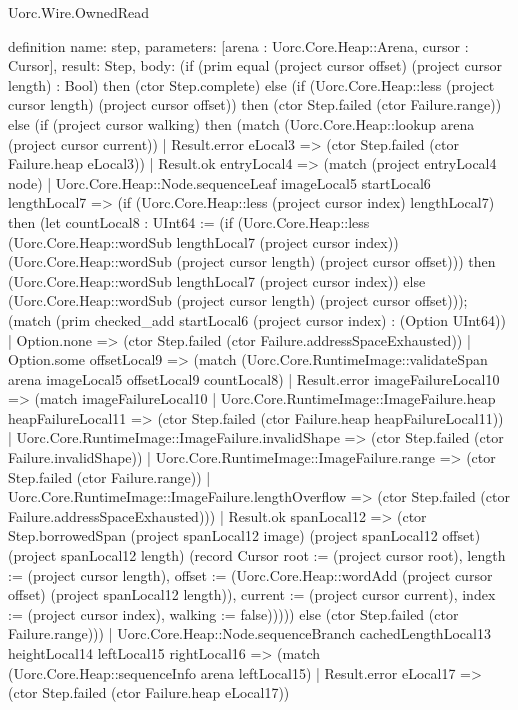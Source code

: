 \begin{lexlean}{Uorc.Wire.OwnedRead}
\begin{semanticmodule}
definition{
  name: step,
  parameters: [arena : Uorc.Core.Heap::Arena, cursor : Cursor],
  result: Step,
  body: (if (prim equal (project cursor offset) (project cursor length) : Bool) then (ctor Step.complete) else (if (Uorc.Core.Heap::less (project cursor length) (project cursor offset)) then (ctor Step.failed (ctor Failure.range)) else (if (project cursor walking) then (match (Uorc.Core.Heap::lookup arena (project cursor current))
    | Result.error eLocal3 => (ctor Step.failed (ctor Failure.heap eLocal3))
    | Result.ok entryLocal4 => (match (project entryLocal4 node)
      | Uorc.Core.Heap::Node.sequenceLeaf imageLocal5 startLocal6 lengthLocal7 => (if (Uorc.Core.Heap::less (project cursor index) lengthLocal7) then (let countLocal8 : UInt64 := (if (Uorc.Core.Heap::less (Uorc.Core.Heap::wordSub lengthLocal7 (project cursor index)) (Uorc.Core.Heap::wordSub (project cursor length) (project cursor offset))) then (Uorc.Core.Heap::wordSub lengthLocal7 (project cursor index)) else (Uorc.Core.Heap::wordSub (project cursor length) (project cursor offset))); (match (prim checked_add startLocal6 (project cursor index) : (Option UInt64))
        | Option.none => (ctor Step.failed (ctor Failure.addressSpaceExhausted))
        | Option.some offsetLocal9 => (match (Uorc.Core.RuntimeImage::validateSpan arena imageLocal5 offsetLocal9 countLocal8)
          | Result.error imageFailureLocal10 => (match imageFailureLocal10
            | Uorc.Core.RuntimeImage::ImageFailure.heap heapFailureLocal11 => (ctor Step.failed (ctor Failure.heap heapFailureLocal11))
            | Uorc.Core.RuntimeImage::ImageFailure.invalidShape => (ctor Step.failed (ctor Failure.invalidShape))
            | Uorc.Core.RuntimeImage::ImageFailure.range => (ctor Step.failed (ctor Failure.range))
            | Uorc.Core.RuntimeImage::ImageFailure.lengthOverflow => (ctor Step.failed (ctor Failure.addressSpaceExhausted)))
          | Result.ok spanLocal12 => (ctor Step.borrowedSpan (project spanLocal12 image) (project spanLocal12 offset) (project spanLocal12 length) (record Cursor {root := (project cursor root), length := (project cursor length), offset := (Uorc.Core.Heap::wordAdd (project cursor offset) (project spanLocal12 length)), current := (project cursor current), index := (project cursor index), walking := false}))))) else (ctor Step.failed (ctor Failure.range)))
      | Uorc.Core.Heap::Node.sequenceBranch cachedLengthLocal13 heightLocal14 leftLocal15 rightLocal16 => (match (Uorc.Core.Heap::sequenceInfo arena leftLocal15)
        | Result.error eLocal17 => (ctor Step.failed (ctor Failure.heap eLocal17))
}
\end{semanticmodule}
\end{lexlean}
